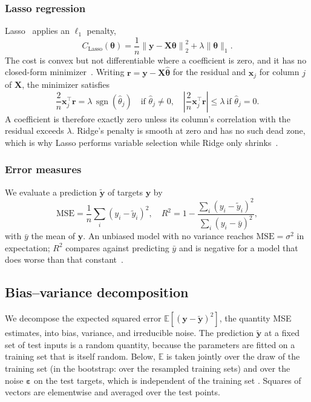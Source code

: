 \subsubsection{Lasso regression}
Lasso~\cite{tibshirani_1996} applies an $\ell_1$ penalty,
\begin{equation}\label{eq:lasso-theta-hat}
    C_\text{Lasso}(\bm{\theta}) = \frac{1}{n}\left\lVert \bm{y}
    - \bm{X}\bm{\theta} \right\rVert_2^2
    + \lambda \lVert \bm{\theta} \rVert_1 .
\end{equation}
The cost is convex but not differentiable where a coefficient is zero, and it
has no closed-form minimizer~\cite{mehta_2019}. Writing $\bm{r} =
\bm{y}-\bm{X}\hat{\bm{\theta}}$ for the residual and $\bm{x}_j$ for column $j$
of $\bm{X}$, the minimizer satisfies
\begin{equation}
    \frac{2}{n}\bm{x}_j^\top\bm{r} = \lambda\,\operatorname{sgn}(\hat\theta_j)
    \quad \text{if } \hat\theta_j \neq 0, \quad
    \left|\frac{2}{n}\bm{x}_j^\top\bm{r}\right| \leq \lambda
    \ \text{if } \hat\theta_j = 0.
    \label{eq:lasso-optimality}
\end{equation}
A coefficient is therefore exactly zero unless its column's correlation
with the residual exceeds $\lambda$. Ridge's penalty is smooth at zero and has
no such dead zone, which is why Lasso performs variable selection while Ridge
only shrinks~\cite[Prop.~3.7]{hjorth-jensen_2026}.

\subsubsection{Error measures}
We evaluate a prediction $\tilde{\bm{y}}$ of targets $\bm{y}$ by
\begin{equation}
    \mathrm{MSE} = \frac{1}{n}\sum_{i}(y_i-\tilde{y}_i)^2, \quad
    R^2 = 1 - \frac{\sum_i (y_i - \tilde{y}_i)^2}{\sum_i (y_i - \bar{y})^2},
\end{equation}
with $\bar{y}$ the mean of $\bm{y}$. An unbiased model with no variance reaches
$\mathrm{MSE} = \sigma^2$ in expectation; $R^2$ compares against predicting
$\bar{y}$ and is negative for a model that does worse than that constant~\cite{hjorth-jensen_2026}.

\subsection{Bias--variance decomposition}
\label{subsec:bias-variance}

We decompose the expected squared error $\mathbb{E}[(\bm{y}-\tilde{\bm{y}})^2]$,
the quantity MSE estimates, into bias, variance, and irreducible noise. The
prediction $\tilde{\bm{y}}$ at a fixed set of test inputs is a random
quantity, because the parameters are fitted on a training set that is itself
random. Below, $\mathbb{E}$ is taken jointly over the draw of the training set
(in the bootstrap: over the resampled training sets) and over the noise
$\bm{\varepsilon}$ on the test targets, which is independent of the training set
\cite{hjorth-jensen_2026}. Squares of vectors are
elementwise and averaged over the test points.

